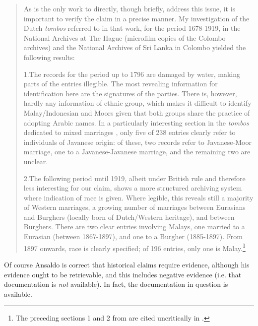 \begin{quote}
  As \citet{Hussainmiya1987} is the only work to directly, though briefly, address this issue, it is important to verify the claim in a precise manner. My investigation of the Dutch \textit{tombos} referred to in that work, for the period 1678-1919, in the National Archives at The Hague (microfilm copies of the Colombo archives) and the National Archives of Sri Lanka in Colombo yielded the following results:

 1.The records for the period up to 1796 are damaged by water, making parts of the entries illegible. The most revealing information for identification here are the signatures of the parties. There is, however, hardly any information of ethnic group, which makes it difficult to identify Malay/Indonesian and Moors given that both groups share the practice of adopting Arabic names. In a particularly interesting section in the \textit{tombos }dedicated to mixed marriages \citep[cf.][]{Hussainmiya1987}, only five of 238 entries clearly refer to individuals of Javanese origin: of these, two records refer to Javanese-Moor marriage, one to a Javanese-Javanese marriage, and the remaining two are unclear.

 2.The following period until 1919, albeit under British rule and therefore less interesting for our claim, shows a more structured archiving system where indication of race is given. Where legible, this reveals still a majority of Western marriages, a growing number of marriages between Eurasians and Burghers (locally born of Dutch/Western heritage), and between Burghers. There are two clear entries involving Malays, one married to a Eurasian (between 1867-1897), and one to a Burgher (1885-1897). From 1897 onwards, race is clearly specified; of 196 entries, only one is Malay.\footnote{The
  preceding sections 1 and 2 from \citet{Ansaldo2008genesis} are cited uncritically in \citep[42-43]{Nordhoff2009}. 
 }

\end{quote}

Of course Ansaldo is correct that historical claims require evidence, although his evidence ought to be retrievable, and this includes negative evidence (i.e. that documentation is \textit{not} available). In fact, the documentation in question is available.

